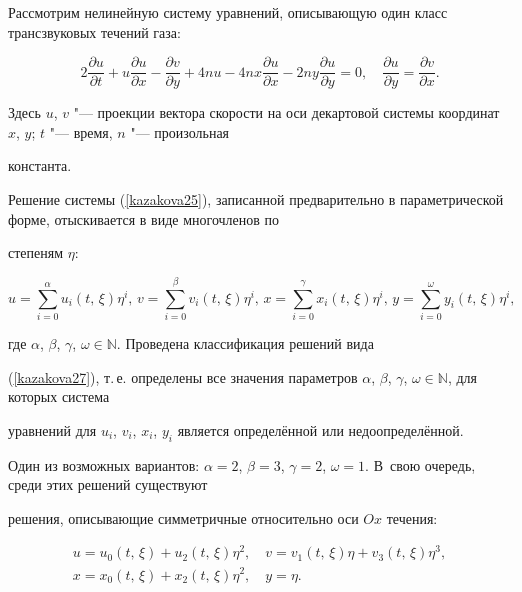 Рассмотрим нелинейную систему уравнений, описывающую один класс \cite{Velmisov_Kazakova} трансзвуковых течений газа:

\begin{equation}\label{kazakova25}

\displaystyle 2 \frac{\partial u}{\partial t} + u\frac{\partial u}{\partial x}-\frac{\partial v}{\partial

y}+4nu-4nx\frac{\partial u}{\partial x}-2ny\frac{\partial u}{\partial y}=0, \quad \frac{\partial u}{\partial y}=\frac{\partial

v}{\partial x}.

\end{equation}

Здесь $u$, $v$ "--- проекции вектора скорости на оси декартовой системы координат  $x$, $y$; $t$ "--- время, $n$ "--- произольная

константа.



Решение системы (\ref{kazakova25}), записанной предварительно в параметрической форме, отыскивается в виде многочленов по

степеням ${\eta}$:

\begin{equation}\label{kazakova27}

u=\sum\limits_{i=0}^\alpha u_i (t,\,\xi)\eta^i,\, v=\sum\limits_{i=0}^\beta v_i(t,\,\xi)\eta^i,\, x=\sum\limits_{i=0}^\gamma x_i

(t,\,\xi) \eta^i,\, y=\sum\limits_{i=0}^\omega y_i(t,\,\xi) \eta^i,\,

\end{equation}

где $\alpha$, $\beta$, $\gamma$, $\omega \in \mathbb N$. Проведена классификация решений вида

(\ref{kazakova27}), т.\,е. определены все значения параметров $\alpha$, $\beta$, $\gamma$, $\omega \in \mathbb N$, для которых система

уравнений для $u_i$, $v_i$, $x_i$, $y_i$ является определённой или недоопределённой.



Один из возможных вариантов: $\alpha=2$, $\beta=3$, $\gamma=2$, $\omega=1$. В~свою очередь, среди этих решений существуют

решения, описывающие симметричные относительно оси $Ox$ течения:

\begin{equation}\label{kazakova28}

\begin {array}{c}

u=u_0(t,\,\xi)+u_2(t,\,\xi)\eta^2,\quad

v=v_1(t,\,\xi)\eta+v_3(t,\,\xi)\eta^3,\\

x=x_0(t,\,\xi)+x_2(t,\,\xi)\eta^2,\quad y=\eta.

\end{array}

\end{equation}

